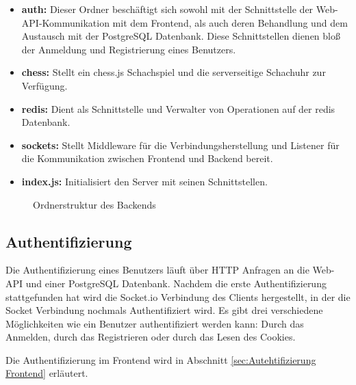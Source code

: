 \begin{itemize}
\item \textbf{auth:} Dieser Ordner beschäftigt sich sowohl mit der Schnittstelle der Web-API-Kommunikation mit dem Frontend, als auch deren Behandlung und dem Austausch mit der PostgreSQL Datenbank. Diese Schnittstellen dienen bloß der Anmeldung und Registrierung eines Benutzers.
\item \textbf{chess:} Stellt ein chess.js Schachspiel und die serverseitige Schachuhr zur Verfügung.
\item \textbf{redis:} Dient als Schnittstelle und Verwalter von Operationen auf der redis Datenbank.
\item \textbf{sockets:} Stellt Middleware für die Verbindungsherstellung und Listener für die Kommunikation zwischen Frontend und Backend bereit.
\item \textbf{index.js:} Initialisiert den Server mit seinen Schnittstellen.
\end{itemize}

\begin{figure}[h]
\centering

\begin{minipage}{0.5\textwidth}
\end{minipage}
\caption{Ordnerstruktur des Backends}
\label{fig:backend_dirtree}

\end{figure}


\subsection{Authentifizierung}
\label{sec:Authentifizierung Backend}
Die Authentifizierung eines Benutzers läuft über HTTP Anfragen an die Web-API und einer PostgreSQL Datenbank.
Nachdem die erste Authentifizierung stattgefunden hat wird die Socket.io Verbindung des Clients hergestellt, in der die Socket Verbindung nochmals Authentifiziert wird.
Es gibt drei verschiedene Möglichkeiten wie ein Benutzer authentifiziert werden kann: Durch das Anmelden, durch das Registrieren oder durch das Lesen des Cookies.

Die Authentifizierung im Frontend wird in Abschnitt \ref{sec:Autehtifizierung Frontend} erläutert.

